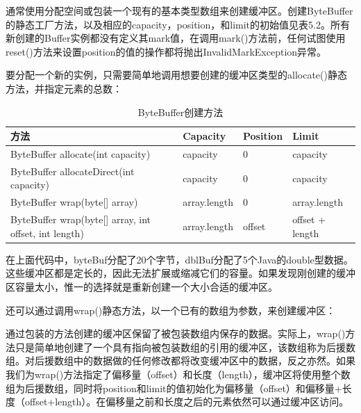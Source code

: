 		通常使用分配空间或包装一个现有的基本类型数组来创建缓冲区。创建ByteBuffer的静态工厂方法，以及相应的capacity，position，和limit的初始值见表5.2。所有新创建的Buffer实例都没有定义其mark值，在调用mark()方法前，任何试图使用reset()方法来设置position的值的操作都将抛出InvalidMarkException异常。 

		要分配一个新的实例，只需要简单地调用想要创建的缓冲区类型的allocate()静态方法，并指定元素的总数： 

		

		\begin{table}[htbp]
			\caption{ByteBuffer创建方法}
			\label{tab:create.byte.buffer}
			\centering
			\begin{tabular}{llll}
				\hline
					方法 & Capacity & Position & Limit \\
				\hline
					ByteBuffer allocate(int capacity)                     & capacity     & 0      & capacity \\
					ByteBuffer allocateDirect(int capacity)               & capacity     & 0      & capacity \\
					ByteBuffer wrap(byte[] array)                         & array.length & 0      & array.length \\
					ByteBuffer wrap(byte[] array, int offset, int length) & array.length & offset & offset + length \\
				\hline
			\end{tabular}
		\end{table}

		在上面代码中，byteBuf分配了20个字节，dblBuf分配了5个Java的double型数据。这些缓冲区都是定长的，因此无法扩展或缩减它们的容量。如果发现刚创建的缓冲区容量太小，惟一的选择就是重新创建一个大小合适的缓冲区。 

		还可以通过调用wrap()静态方法，以一个已有的数组为参数，来创建缓冲区： 

		

		通过包装的方法创建的缓冲区保留了被包装数组内保存的数据。实际上，wrap()方法只是简单地创建了一个具有指向被包装数组的引用的缓冲区，该数组称为后援数组。对后援数组中的数据做的任何修改都将改变缓冲区中的数据，反之亦然。如果我们为wrap()方法指定了偏移量（offset）和长度（length），缓冲区将使用整个数组为后援数组，同时将position和limit的值初始化为偏移量（offset）和偏移量+长度（offset+length）。在偏移量之前和长度之后的元素依然可以通过缓冲区访问。 

